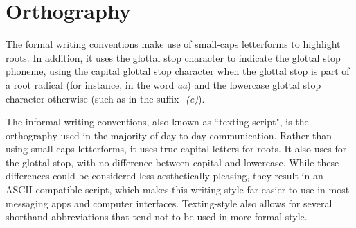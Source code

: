 
\section{Orthography}


The formal writing conventions make use of small-caps letterforms to highlight roots. In addition, it uses the glottal stop character to indicate the glottal stop phoneme, using the capital glottal stop character \sqbrack{\bigglot} when the glottal stop is part of a root radical (for instance, in the word \textit{\bigglot a\bigglot a}) and the lowercase glottal stop character \sqbrack{\lilglot} otherwise (such as in the suffix \textit{-(e)}\lilglot).

The informal writing conventions, also known as ``texting script", is the orthography used in the majority of day-to-day communication. Rather than using small-caps letterforms, it uses true capital letters for roots. It also uses  for the glottal stop, with no difference between capital and lowercase. While these differences could be considered less aesthetically pleasing, they result in an ASCII-compatible script, which makes this writing style far easier to use in most messaging apps and computer interfaces. Texting-style \lang{} also allows for several shorthand abbreviations that tend not to be used in more formal style.
